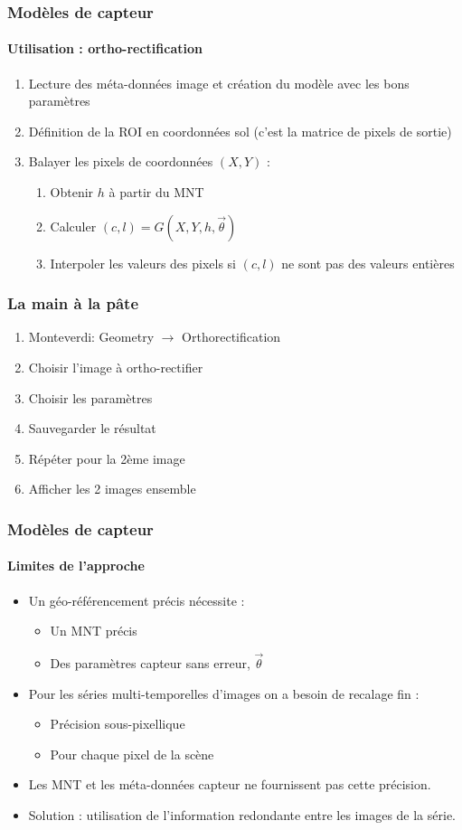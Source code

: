 \documentclass[compress]{beamer}
\begin{document}
\begin{frame}
  \frametitle{Modèles de capteur}

  \framesubtitle{Utilisation : ortho-rectification}
  \begin{enumerate}
    \item Lecture des méta-données image et création du modèle avec
      les bons paramètres
  \item Définition de la ROI en coordonnées sol (c'est la matrice de
    pixels de sortie)
  \item Balayer les pixels de coordonnées $(X,Y)$ :
    \begin{enumerate}
      \item Obtenir $h$ à partir du MNT
      \item Calculer $(c,l) = G(X,Y,h,\vec\theta)$
      \item Interpoler les valeurs des pixels si $(c,l)$ ne sont pas
        des valeurs entières
    \end{enumerate}
  \end{enumerate}
\end{frame}

\begin{frame}
\frametitle{La main à la pâte}
\begin{enumerate}
\item Monteverdi: Geometry $\rightarrow$ Orthorectification
\item Choisir l'image à ortho-rectifier
\item Choisir les paramètres
\item Sauvegarder le résultat
\item Répéter pour la 2ème image
\item Afficher les 2 images ensemble
\end{enumerate}
\end{frame}


\begin{frame}
  \frametitle{Modèles de capteur}
  \framesubtitle{Limites de l'approche}

  \begin{itemize}
    \item Un géo-référencement précis nécessite :
      \begin{itemize}
	\item Un MNT précis
	\item Des paramètres capteur sans erreur, $\vec\theta$
      \end{itemize}
    \item Pour les séries multi-temporelles d'images on a besoin de
      \alert{recalage fin} :
      \begin{itemize}
      \item Précision sous-pixellique
      \item Pour chaque pixel de la scène
      \end{itemize}
    \item Les MNT et les méta-données capteur ne fournissent pas cette
      précision.
    \item Solution : utilisation de l'information redondante entre les
      images de la série.
  \end{itemize}
\end{frame}
\end{document}
